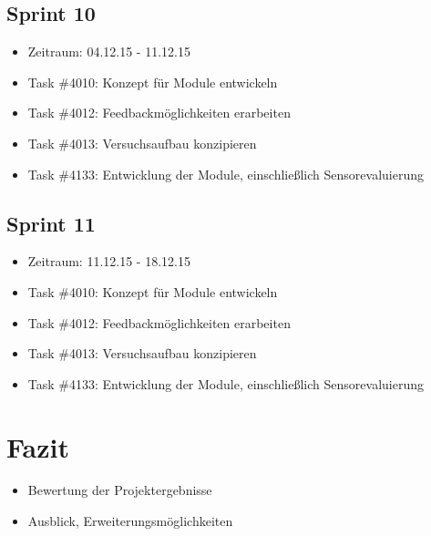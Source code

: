 \documentclass[12pt, oneside, smallheadings]{scrbook}
\begin{document}
\section{Sprint 10}
\begin{itemize}
	\item Zeitraum: 04.12.15 - 11.12.15
	\item Task \#4010: Konzept für Module entwickeln
	\item Task \#4012: Feedbackmöglichkeiten erarbeiten
	\item Task \#4013: Versuchsaufbau konzipieren
	\item Task \#4133: Entwicklung der Module, einschließlich Sensorevaluierung
\end{itemize}

\section{Sprint 11}
\begin{itemize}
	\item Zeitraum: 11.12.15 - 18.12.15
	\item Task \#4010: Konzept für Module entwickeln
	\item Task \#4012: Feedbackmöglichkeiten erarbeiten
	\item Task \#4013: Versuchsaufbau konzipieren
	\item Task \#4133: Entwicklung der Module, einschließlich Sensorevaluierung
\end{itemize}



\chapter{Fazit}
\begin{itemize}
	\item Bewertung der Projektergebnisse
	\item Ausblick, Erweiterungsmöglichkeiten
\end{itemize}

\newpage

%
%


\appendix


\end{document}
